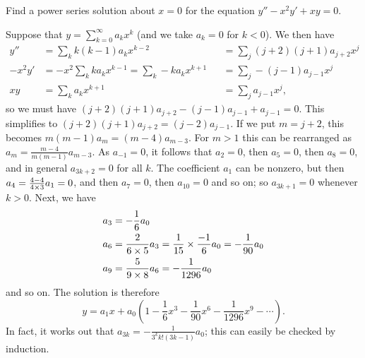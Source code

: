 \documentclass[a4paper]{amsart}
\begin{document}
\begin{exercise}\label{ex-series-a}
 Find a power series solution about $x=0$ for the equation
 $y''-x^2y'+xy=0$.  
\end{exercise}
\begin{solution}
 Suppose that $y=\sum_{k=0}^\infty a_kx^k$ (and we take $a_k=0$ for
 $k<0$).  We then have
 \begin{align*}
  y'' &= \sum_k k(k-1)a_kx^{k-2}
      &&= \sum_j (j+2)(j+1)a_{j+2} x^j \\
  -x^2y' &= -x^2\sum_k ka_k x^{k-1} = \sum_k -ka_kx^{k+1} 
         &&= \sum_j -(j-1)a_{j-1}x^j \\
  xy &= \sum_k a_kx^{k+1} &&= \sum_j a_{j-1}x^j,
 \end{align*}
 so we must have $(j+2)(j+1)a_{j+2}-(j-1)a_{j-1}+a_{j-1}=0$.  This
 simplifies to $(j+2)(j+1)a_{j+2}=(j-2)a_{j-1}$.  If we put $m=j+2$,
 this becomes $m(m-1)a_m=(m-4)a_{m-3}$.  For $m>1$ this can be
 rearranged as $a_m=\frac{m-4}{m(m-1)}a_{m-3}$.  As $a_{-1}=0$, it
 follows that $a_2=0$, then $a_5=0$, then $a_8=0$, and in general
 $a_{3k+2}=0$ for all $k$.  The coefficient $a_1$ can be nonzero, but
 then $a_4=\frac{4-4}{4\times 3}a_1=0$, and then $a_7=0$, then $a_{10}=0$
 and so on; so $a_{3k+1}=0$ whenever $k>0$.  Next, we have
 \begin{align*}
  a_3 &= -\frac{1}{6} a_0 \\
  a_6 &= \frac{2}{6\times 5}a_3
       = \frac{1}{15}\times\frac{-1}{6}a_0  = -\frac{1}{90}a_0 \\
  a_9 &= \frac{5}{9\times 8}a_6 = -\frac{1}{1296}a_0
 \end{align*}
 and so on.  The solution is therefore 
 \[ y = a_1x +
          a_0(1-\frac{1}{6}x^3-\frac{1}{90}x^6-\frac{1}{1296}x^9-\dotsb).
 \]
 In fact, it works out that $a_{3k}=-\frac{1}{3^kk!(3k-1)}a_0$; this
 can easily be checked by induction.
\end{solution}
\end{document}
